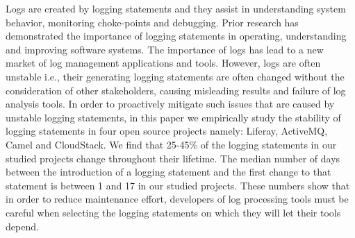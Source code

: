 
Logs are created by logging statements and they	 assist in understanding system behavior, monitoring choke-points and debugging. Prior research has demonstrated the importance of  logging statements in operating, understanding and improving software systems. The importance of logs has lead to a new market of log management applications and tools. However, logs are often unstable i.e., their generating logging statements are often changed without the consideration of other stakeholders, causing misleading results and failure of log analysis tools. In order to proactively mitigate such issues that are caused by unstable logging statements, in this paper we empirically study the stability of logging statements in four open source projects namely: Liferay, ActiveMQ, Camel and CloudStack. We find that 25-45\% of the logging statements in our studied projects change throughout their lifetime. The median number of days between the introduction of a logging statement and the first change to that statement is between 1  and 17 in our studied projects. These numbers show that in order to reduce maintenance effort, developers of log processing tools must be careful when selecting the logging statements on which they will let their tools depend.

